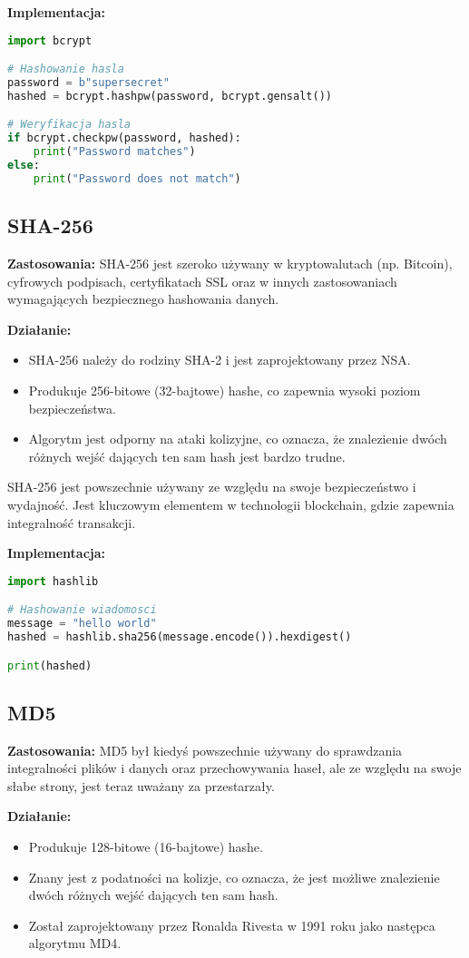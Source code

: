 \documentclass{article}
\begin{document}
\textbf{Implementacja:}
\begin{lstlisting}[language=Python]
import bcrypt

# Hashowanie hasla
password = b"supersecret"
hashed = bcrypt.hashpw(password, bcrypt.gensalt())

# Weryfikacja hasla
if bcrypt.checkpw(password, hashed):
    print("Password matches")
else:
    print("Password does not match")
\end{lstlisting}

\subsection{SHA-256}
\textbf{Zastosowania:} SHA-256 jest szeroko używany w kryptowalutach (np. Bitcoin), cyfrowych podpisach, certyfikatach SSL oraz w innych zastosowaniach wymagających bezpiecznego hashowania danych.

\textbf{Działanie:}
\begin{itemize}
    \item SHA-256 należy do rodziny SHA-2 i jest zaprojektowany przez NSA.
    \item Produkuje 256-bitowe (32-bajtowe) hashe, co zapewnia wysoki poziom bezpieczeństwa.
    \item Algorytm jest odporny na ataki kolizyjne, co oznacza, że znalezienie dwóch różnych wejść dających ten sam hash jest bardzo trudne.
\end{itemize}

SHA-256 jest powszechnie używany ze względu na swoje bezpieczeństwo i wydajność. Jest kluczowym elementem w technologii blockchain, gdzie zapewnia integralność transakcji.

\textbf{Implementacja:}
\begin{lstlisting}[language=Python]
import hashlib

# Hashowanie wiadomosci
message = "hello world"
hashed = hashlib.sha256(message.encode()).hexdigest()

print(hashed)
\end{lstlisting}

\subsection{MD5}
\textbf{Zastosowania:} MD5 był kiedyś powszechnie używany do sprawdzania integralności plików i danych oraz przechowywania haseł, ale ze względu na swoje słabe strony, jest teraz uważany za przestarzały.

\textbf{Działanie:}
\begin{itemize}
    \item Produkuje 128-bitowe (16-bajtowe) hashe.
    \item Znany jest z podatności na kolizje, co oznacza, że jest możliwe znalezienie dwóch różnych wejść dających ten sam hash.
    \item Został zaprojektowany przez Ronalda Rivesta w 1991 roku jako następca algorytmu MD4.
\end{itemize}
\end{document}
